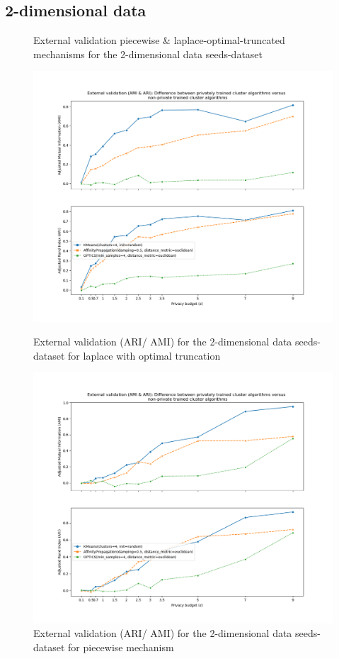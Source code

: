 \subsection{2-dimensional data}
\begin{figure}[!htbp]
    \caption{External validation piecewise \& laplace-optimal-truncated mechanisms for the 2-dimensional data seeds-dataset}
    \centering
    \begin{minipage}[c]{0.49\textwidth}
        \includegraphics[width=1\textwidth]{Results/2d-laplace-optimal-truncated/seeds-dataset/ami-and-ari.png}
        \caption{External validation (ARI/ AMI) for the 2-dimensional data seeds-dataset for laplace with optimal truncation}
        \label{fig:external-validation-seeds-dataset_comparison_2d-laplace}
    \end{minipage}
    \begin{minipage}[c]{0.49\textwidth}
        \includegraphics[width=1\textwidth]{Results/2d-piecewise/seeds-dataset/ami-and-ari.png}
        \caption{External validation (ARI/ AMI) for the 2-dimensional data seeds-dataset for piecewise mechanism}
        \label{fig:external-validation-seeds-dataset_comparison_2d-piecewise}
    \end{minipage}


\end{figure}
